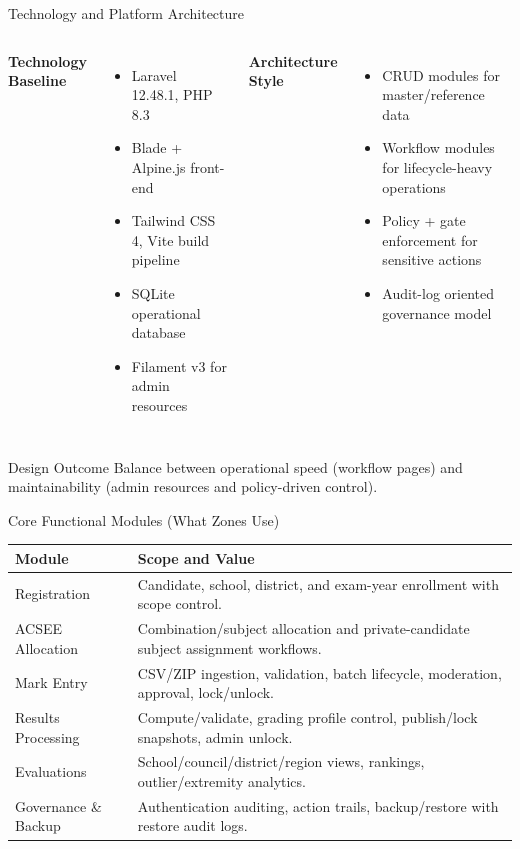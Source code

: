 \documentclass[aspectratio=169,11pt]{beamer}
\begin{document}
\begin{frame}{Technology and Platform Architecture}
\begin{columns}[T]
\textbf{Technology Baseline}
\begin{itemize}
  \item Laravel 12.48.1, PHP 8.3
  \item Blade + Alpine.js front-end
  \item Tailwind CSS 4, Vite build pipeline
  \item SQLite operational database
  \item Filament v3 for admin resources
\end{itemize}

\textbf{Architecture Style}
\begin{itemize}
  \item CRUD modules for master/reference data
  \item Workflow modules for lifecycle-heavy operations
  \item Policy + gate enforcement for sensitive actions
  \item Audit-log oriented governance model
\end{itemize}
\end{columns}

\vspace{0.25cm}
\begin{block}{Design Outcome}
Balance between operational speed (workflow pages) and maintainability (admin resources and policy-driven control).
\end{block}
\end{frame}

\begin{frame}{Core Functional Modules (What Zones Use)}
\small
\begin{tabularx}{\textwidth}{>{\RaggedRight\arraybackslash}p{3.0cm} X}
\toprule
\textbf{Module} & \textbf{Scope and Value} \\
\midrule
Registration & Candidate, school, district, and exam-year enrollment with scope control. \\
ACSEE Allocation & Combination/subject allocation and private-candidate subject assignment workflows. \\
Mark Entry & CSV/ZIP ingestion, validation, batch lifecycle, moderation, approval, lock/unlock. \\
Results Processing & Compute/validate, grading profile control, publish/lock snapshots, admin unlock. \\
Evaluations & School/council/district/region views, rankings, outlier/extremity analytics. \\
Governance \& Backup & Authentication auditing, action trails, backup/restore with restore audit logs. \\
\bottomrule
\end{tabularx}
\end{frame}
\end{document}
